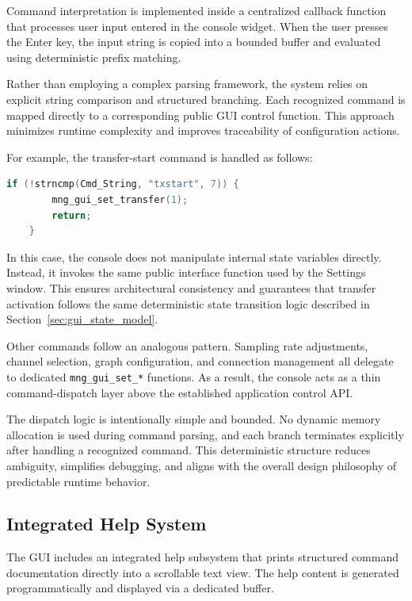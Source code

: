 Command interpretation is implemented inside a centralized callback function that processes user input entered in the console widget. When the user presses the Enter key, the input string is copied into a bounded buffer and evaluated using deterministic prefix matching.

Rather than employing a complex parsing framework, the system relies on explicit string comparison and structured branching. Each recognized command is mapped directly to a corresponding public GUI control function. This approach minimizes runtime complexity and improves traceability of configuration actions.

For example, the transfer-start command is handled as follows:

\begin{lstlisting}[language=C]
	if (!strncmp(Cmd_String, "txstart", 7)) {
		mng_gui_set_transfer(1);
		return;
	}
\end{lstlisting}

In this case, the console does not manipulate internal state variables directly. Instead, it invokes the same public interface function used by the Settings window. This ensures architectural consistency and guarantees that transfer activation follows the same deterministic state transition logic described in Section~\ref{sec:gui_state_model}.

Other commands follow an analogous pattern. Sampling rate adjustments, channel selection, graph configuration, and connection management all delegate to dedicated \texttt{mng\_gui\_set\_*} functions. As a result, the console acts as a thin command-dispatch layer above the established application control API.

The dispatch logic is intentionally simple and bounded. No dynamic memory allocation is used during command parsing, and each branch terminates explicitly after handling a recognized command. This deterministic structure reduces ambiguity, simplifies debugging, and aligns with the overall design philosophy of predictable runtime behavior.

\subsection{Integrated Help System}
\label{sec:gui_help_system}

The GUI includes an integrated help subsystem that prints structured command documentation directly into a scrollable text view. The help content is generated programmatically and displayed via a dedicated buffer.

